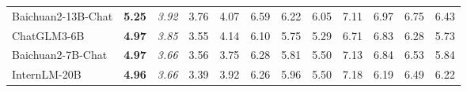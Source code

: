 \documentclass[11pt, a4paper, logo, copyright, nonumbering]{deepseek}
\begin{document}
\begin{CJK*}{UTF8}{gbsn}
\begin{table}[t]
{\begin{tabular}{@{}l|c|ccc|ccccccc@{}}
Baichuan2-13B-Chat              & \textbf{5.25}                     & \multicolumn{1}{c|}{\textit{3.92}}                                   & 3.76                                            & 4.07                                            & \multicolumn{1}{c|}{6.59}                                            & 6.22                                            & 6.05                                            & 7.11                                            & 6.97                                            & 6.75                                            & 6.43                                            \\
ChatGLM3-6B                     & \textbf{4.97}                     & \multicolumn{1}{c|}{\textit{3.85}}                                   & 3.55                                            & 4.14                                            & \multicolumn{1}{c|}{6.10}                                            & 5.75                                            & 5.29                                            & 6.71                                            & 6.83                                            & 6.28                                            & 5.73                                            \\
Baichuan2-7B-Chat               & \textbf{4.97}                     & \multicolumn{1}{c|}{\textit{3.66}}                                   & 3.56                                            & 3.75                                            & \multicolumn{1}{c|}{6.28}                                            & 5.81                                            & 5.50                                            & 7.13                                            & 6.84                                            & 6.53                                            & 5.84                                            \\
InternLM-20B                    & \textbf{4.96}                     & \multicolumn{1}{c|}{\textit{3.66}}                                   & 3.39                                            & 3.92                                            & \multicolumn{1}{c|}{6.26}                                            & 5.96                                            & 5.50                                            & 7.18                                            & 6.19                                            & 6.49                                            & 6.22                                            \\

\end{tabular}}
\end{table}
\end{CJK*}
\end{document}
